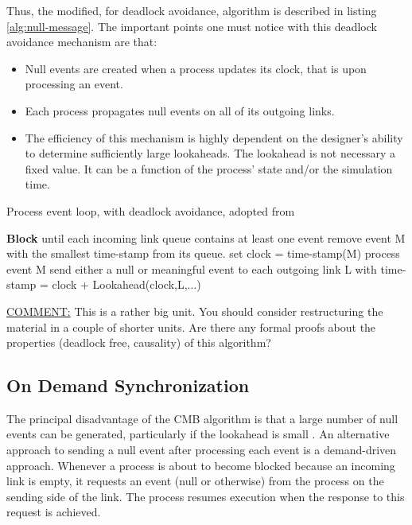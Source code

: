 \documentclass[12pt,twoside]{article}
\begin{document}
Thus, the modified, for deadlock avoidance, algorithm is described in listing \ref{alg:null-message}.
The important points one must notice with this deadlock avoidance mechanism are that:
\begin{itemize}
\item Null events are created when a process updates its clock, that is upon processing an event.
\item Each process propagates null events on all of its outgoing links.
\item The efficiency of this mechanism is highly dependent on the designer's ability to determine sufficiently large lookaheads. The lookahead is not necessary a fixed value. It can be a function of the process' state and/or the simulation time.
\end{itemize}

\begin{algorithm}
\caption{Process event loop, with deadlock avoidance, adopted from \cite{Fujimoto1999}}
\label{alg:null-message}
\begin{algorithmic}[2]

      \State \textbf{Block} until each incoming link queue contains at least one event
      \State remove event M with the smallest time-stamp from its queue.
      \State set clock = time-stamp(M)
      \State process event M
      \State send either a null or meaningful event to each outgoing link L with time-stamp = clock + Lookahead(clock,L,...)
   \EndWhile

\end{algorithmic}
\end{algorithm}


\uline{COMMENT:} This is a rather big unit. You should consider restructuring the material in a couple of shorter units. Are there any formal proofs about the properties (deadlock free, causality) of this algorithm? 



\subsection{On Demand Synchronization}
\label{sec-5-2}
The principal disadvantage of the CMB algorithm is that a large number of null events can be generated, particularly if the lookahead is small \cite{Fujimoto1999}.
An alternative approach to sending a null event after processing each event is a demand-driven approach.
Whenever a process is about to become blocked because an incoming link is empty, it requests an event (null or otherwise) from the process on the sending side of the link.
The process resumes execution when the response to this request is achieved.
\end{document}
